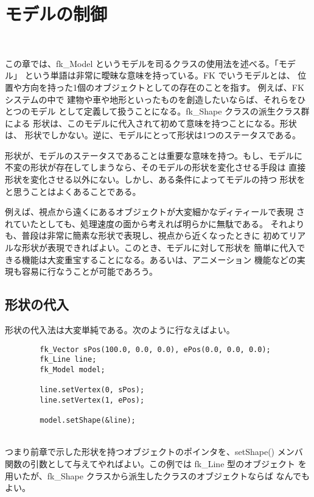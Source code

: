 \chapter{モデルの制御} \label{chap:model} ~

この章では、fk\_Model というモデルを司るクラスの使用法を述べる。「モデル」
という単語は非常に曖昧な意味を持っている。FK でいうモデルとは、
位置や方向を持った1個のオブジェクトとしての存在のことを指す。
例えば、FK システムの中で
建物や車や地形といったものを創造したいならば、それらをひとつのモデル
として定義して扱うことになる。fk\_Shape クラスの派生クラス群による
形状は、このモデルに代入されて初めて意味を持つことになる。形状は、
形状でしかない。逆に、モデルにとって形状は1つのステータスである。

形状が、モデルのステータスであることは重要な意味を持つ。もし、モデルに
不変の形状が存在してしまうなら、そのモデルの形状を変化させる手段は
直接形状を変化させる以外にない。しかし、ある条件によってモデルの持つ
形状をと思うことはよくあることである。

例えば、視点から遠くにあるオブジェクトが大変細かなディティールで表現
されていたとしても、処理速度の面から考えれば明らかに無駄である。
それよりも、普段は非常に簡素な形状で表現し、視点から近くなったときに
初めてリアルな形状が表現できればよい。このとき、モデルに対して形状を
簡単に代入できる機能は大変重宝することになる。あるいは、アニメーション
機能などの実現も容易に行なうことが可能であろう。
\section{形状の代入}
形状の代入法は大変単純である。次のように行なえばよい。
\\
\begin{breakbox}
\begin{verbatim}
        fk_Vector sPos(100.0, 0.0, 0.0), ePos(0.0, 0.0, 0.0);
        fk_Line line;
        fk_Model model;

        line.setVertex(0, sPos);
        line.setVertex(1, ePos);

        model.setShape(&line);
\end{verbatim}
\end{breakbox}
~ \\
つまり前章で示した形状を持つオブジェクトのポインタを、setShape() メンバ
関数の引数として与えてやればよい。この例では fk\_Line 型のオブジェクト
を用いたが、fk\_Shape クラスから派生したクラスのオブジェクトならば
なんでもよい。

